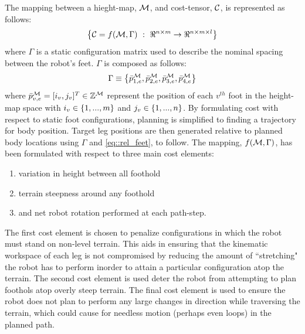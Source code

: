 			The mapping between a hieght-map,  ${\cal M}$, and cost-tensor, ${\cal C}$, is represented as follows:
				\begin{equation}
					\left\{ {\cal C} = f({\cal M},\Gamma)\text{ }:\text{ }\Re^{n\times m} \rightarrow \Re^{n\times m \times l} \right\}
					\label{eq::cost_mapping}
				\end{equation}
			where $\Gamma$ is a static configuration matrix used to describe the nominal spacing between the robot's feet. $\Gamma$ is composed as follows:
				\begin{equation*}
					\Gamma \equiv \left\{\bar{p}_{1,e}^{{\cal M}},\bar{p}_{2,e}^{{\cal M}},\bar{p}_{3,e}^{{\cal M}},\bar{p}_{4,e}^{{\cal M}}\right\}
					\label{eq::cost_gamma}
				\end{equation*}
			where $\bar{p}_{v,e}^{{\cal M}}=[i_{v},j_{v}]^{T}\in{\Bbb Z}^{{\cal M}}$ represent the position of each $v^{th}$ foot in the height-map space with $i_{v}\in \left\{1,...,m\right\}$ and $j_{v}\in\left\{1,...,n\right\}$. By formulating cost with respect to static foot configurations, planning is simplified to finding a trajectory for body position. Target leg positions are then generated relative to planned body locations using $\Gamma$ and \ref{eq::rel_feet}, to follow. The mapping, $f({\cal M},\Gamma)$, has been formulated with respect to three main cost elements:
				\begin{enumerate}
					\item variation in height between all foothold
					\item terrain steepness around any foothold
					\item and net robot rotation performed at each path-step.
				\end{enumerate}
			The first cost element is chosen to penalize configurations in which the robot must stand on non-level terrain. This aids in ensuring that the kinematic workspace of each leg is not compromised by reducing the amount of ``stretching" the robot has to perform inorder to attain a particular configuration atop the terrain. The second cost element is used deter the robot from attempting to plan foothols atop overly steep terrain. The final cost element is used to ensure the robot does not plan to perform any large changes in direction while traversing the terrain, which could cause for needless motion (perhaps even loops) in the planned path. 

